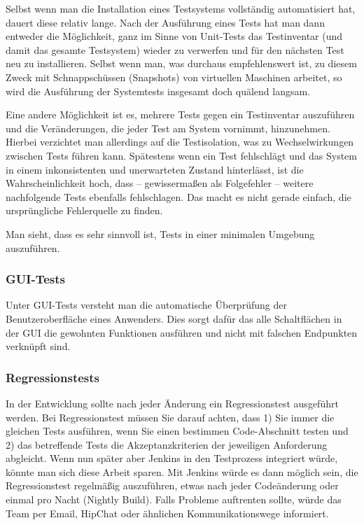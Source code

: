 Selbst wenn man die Installation eines Testsystems vollständig automatisiert hat, dauert
diese relativ lange. Nach der Ausführung eines Tests hat man dann entweder die Möglichkeit,
ganz im Sinne von Unit-Tests das Testinventar (und damit das gesamte Testsystem)
wieder zu verwerfen und für den nächsten Test neu zu installieren. Selbst wenn man, was
durchaus empfehlenswert ist, zu diesem Zweck mit Schnappschüssen (Snapshots) von virtuellen 
Maschinen arbeitet, so wird die Ausführung der Systemtests insgesamt doch quälend langsam.

Eine andere Möglichkeit ist es, mehrere Tests gegen ein Testinventar auszuführen und
die Veränderungen, die jeder Test am System vornimmt, hinzunehmen. Hierbei verzichtet
man allerdings auf die Testisolation, was zu Wechselwirkungen zwischen Tests führen
kann. Spätestens wenn ein Test fehlschlägt und das System in einem inkonsistenten und
unerwarteten Zustand hinterlässt, ist die Wahrscheinlichkeit hoch, dass – gewissermaßen
als Folgefehler – weitere nachfolgende Tests ebenfalls fehlschlagen. Das macht es nicht
gerade einfach, die ursprüngliche Fehlerquelle zu finden.

Man sieht, dass es sehr sinnvoll ist, Tests in einer minimalen Umgebung auszuführen.

\subsubsection{GUI-Tests}
Unter GUI-Tests versteht man die automatische Überprüfung der Benutzeroberfläche eines Anwenders.
Dies sorgt dafür das alle Schaltflächen in der GUI die gewohnten Funktionen ausführen und
nicht mit falschen Endpunkten verknüpft sind.

\subsubsection{Regressionstests}
In der Entwicklung sollte nach jeder Änderung ein Regressionstest ausgeführt werden. Bei Regressionstest
müssen Sie darauf achten, dass 1) Sie immer die gleichen Tests ausführen, wenn Sie einen
bestimmen Code-Abschnitt testen und 2) das betreffende Tests die Akzeptanzkriterien der jeweiligen
Anforderung abgleicht. Wenn nun später aber Jenkins in den Testprozess integriert würde, könnte
man sich diese Arbeit sparen. Mit Jenkins würde es dann möglich sein, die Regressionstest regelmäßig
auszuführen, etwas nach jeder Codeänderung oder einmal pro Nacht (Nightly Build). Falls Probleme auftrenten sollte, würde das Team per Email, HipChat oder ähnlichen Kommunikationswege informiert.

